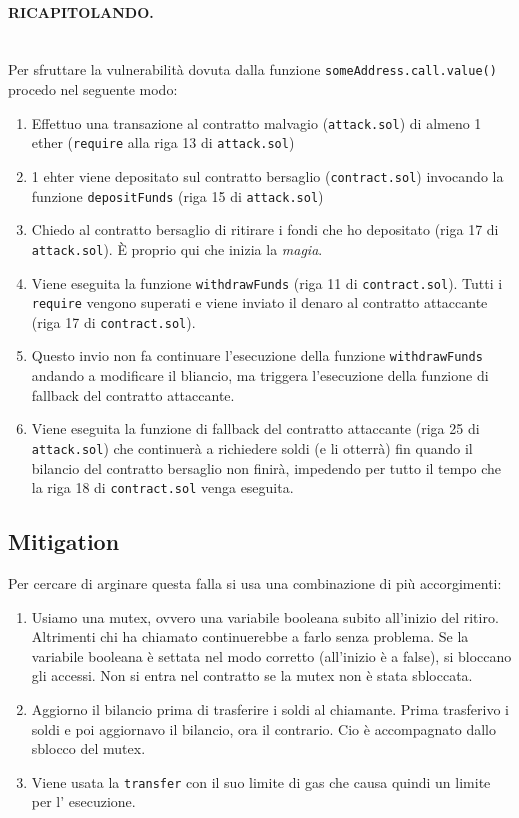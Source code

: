 \paragraph{RICAPITOLANDO.}\ \\
Per sfruttare la vulnerabilità dovuta dalla funzione \verb|someAddress.call.value()|
procedo nel seguente modo:

\begin{enumerate}
    \item Effettuo una transazione al contratto malvagio (\verb|attack.sol|) di almeno
          1 ether (\verb|require| alla riga 13 di \verb|attack.sol|)
    \item 1 ehter viene depositato sul contratto bersaglio (\verb|contract.sol|) invocando
          la funzione \verb|depositFunds| (riga 15 di \verb|attack.sol|)
    \item Chiedo al contratto bersaglio di ritirare i fondi che ho depositato
          (riga 17 di \verb|attack.sol|). È proprio qui che inizia la \textit{magia}.
    \item  Viene eseguita la funzione \verb|withdrawFunds| (riga 11 di \verb|contract.sol|).
          Tutti i \verb|require| vengono superati e viene inviato il denaro al contratto attaccante
          (riga 17 di \verb|contract.sol|).
    \item Questo invio non fa continuare l'esecuzione della funzione \verb|withdrawFunds|
          andando a modificare il bliancio, ma triggera l'esecuzione della funzione
          di fallback del contratto attaccante.
    \item  Viene eseguita la funzione di fallback del contratto attaccante
          (riga 25 di \verb|attack.sol|) che continuerà a richiedere soldi
          (e li otterrà) fin
          quando il bilancio del contratto bersaglio non finirà, impedendo
          per tutto il tempo che la riga 18 di \verb|contract.sol| venga eseguita.
\end{enumerate}

\subsection{Mitigation}

Per cercare di arginare questa falla si usa una combinazione di più accorgimenti:

\begin{enumerate}
    \item Usiamo una mutex, ovvero una variabile booleana subito all'inizio
          del ritiro. Altrimenti chi ha chiamato continuerebbe a farlo senza problema.
          Se la variabile booleana è
          settata nel modo corretto (all'inizio è a false), si bloccano gli accessi.
          Non si entra nel
          contratto se la mutex non è stata sbloccata.
    \item Aggiorno il bilancio prima di trasferire i soldi al chiamante.
          Prima trasferivo i soldi e
          poi aggiornavo il bilancio, ora il contrario.
          Cio è accompagnato dallo sblocco del
          mutex.
    \item Viene usata la \verb|transfer| con il suo limite di gas che causa
          quindi un limite per l'
          esecuzione.
\end{enumerate}